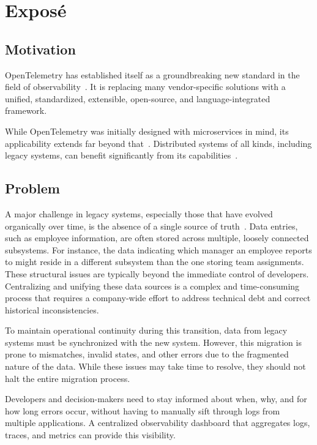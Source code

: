 \chapter{Exposé}

\section{Motivation}

OpenTelemetry has established itself as a groundbreaking new standard in the field of observability~\cite{Young2024, Young2021}.
It is replacing many vendor-specific solutions with a unified, standardized, extensible, open-source, 
and language-integrated framework.

While OpenTelemetry was initially designed with microservices in mind, its applicability extends far beyond that~\cite{Boten2022}.
Distributed systems of all kinds, including legacy systems, can benefit significantly from its capabilities~\cite{Gomez_Blanco2023}.

\section{Problem}

A major challenge in legacy systems, especially those that have evolved organically over time,
is the absence of a single source of truth~\cite{Flanders2024}.
Data entries, such as employee information, are often stored across multiple, loosely connected subsystems.
For instance, the data indicating which manager an employee reports to might reside in a
different subsystem than the one storing team assignments.
These structural issues are typically beyond the immediate control of developers.
Centralizing and unifying these data sources is a complex and time-consuming process
that requires a company-wide effort to address technical debt and correct historical inconsistencies.

To maintain operational continuity during this transition, data from legacy systems must be synchronized with the new system.
However, this migration is prone to mismatches, invalid states, and other errors due to the fragmented nature of the data.
While these issues may take time to resolve, they should not halt the entire migration process.

Developers and decision-makers need to stay informed about when, why, and for how long errors
occur, without having to manually sift through logs from multiple applications.
A centralized observability dashboard that aggregates logs, traces, and metrics can provide this visibility.

